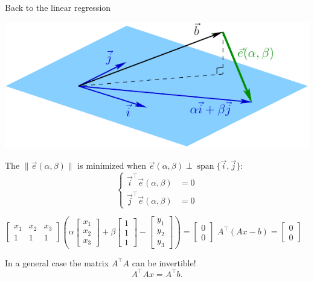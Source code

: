 \documentclass[UKenglish,aspectratio=169]{beamer}
\DeclareMathOperator{\Span}{span}
\begin{document}
\begin{frame}{Back to the linear regression}
\begin{minipage}{.5\linewidth}
\includegraphics[width=\linewidth]{../manuscript/img/error.pdf}
\end{minipage}
\pause
\quad
\begin{minipage}{.45\linewidth}
The $\|\vec{e}(\alpha, \beta)\|$ is minimized when $\vec{e}(\alpha, \beta) \perp \Span\{\vec i, \vec j\}$:
$$
\left\{
\begin{split}\vec{i}^\top \vec{e}(\alpha, \beta) &= 0\\
\vec{j}^\top \vec{e}(\alpha, \beta) &= 0
\end{split}
\right.
$$
\end{minipage}
\pause
$
\begin{bmatrix}x_1 & x_2 & x_3 \\ 1 & 1 & 1 \end{bmatrix}
\left(\alpha \begin{bmatrix}x_1  \\ x_2 \\x_3  \end{bmatrix}
+\beta \begin{bmatrix}1 \\ 1 \\1 \end{bmatrix} -
\begin{bmatrix}y_1\\y_2\\y_3\end{bmatrix}\right) = \begin{bmatrix}0\\0\end{bmatrix}
$
\pause
\quad \qquad \qquad
$A^\top (Ax - b)= \begin{bmatrix}0\\0\end{bmatrix}$
\pause
\begin{block}{In a general case the matrix $A^\top A$ can be invertible!}
$$
A^\top Ax = A^\top b.
$$
\end{block}

\end{frame}
\end{document}
